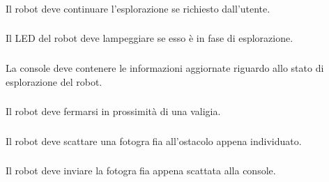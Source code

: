 \subsubsection[R-continueExplore]{}

Il robot deve continuare l'esplorazione se richiesto dall'utente.

\subsubsection[R-blinkLed]{}

Il LED del robot deve lampeggiare se esso è in fase di esplorazione.

\subsubsection[R-consoleUpdate]{}

La console deve contenere le informazioni aggiornate riguardo allo stato di esplorazione del robot.

\subsubsection[R-stopAtBag]{}

Il robot deve fermarsi in prossimità di una valigia.

\subsubsection[R-takePhoto]{}

Il robot deve scattare una fotografia all'ostacolo appena individuato.

\subsubsection[R-sendPhoto]{}

Il robot deve inviare la fotografia appena scattata alla console.

\subsubsection[R-alert]{}

